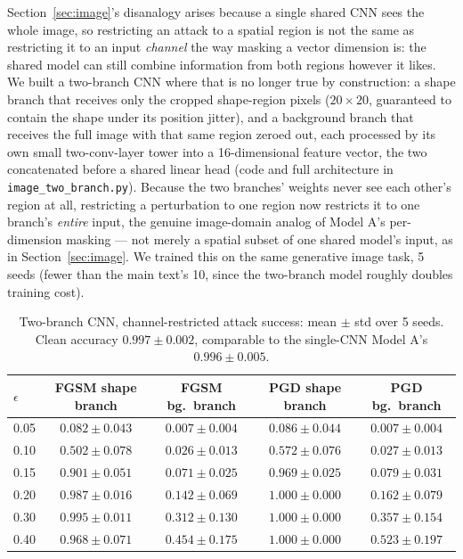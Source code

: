 \documentclass[11pt]{article}
\begin{document}
Section~\ref{sec:image}'s disanalogy arises because a single shared CNN
sees the whole image, so restricting an attack to a spatial region is not
the same as restricting it to an input \emph{channel} the way masking a
vector dimension is: the shared model can still combine information from
both regions however it likes. We built a two-branch CNN where that is no
longer true by construction: a shape branch that receives only the
cropped shape-region pixels ($20\times20$, guaranteed to contain the
shape under its position jitter), and a background branch that receives
the full image with that same region zeroed out, each processed by its
own small two-conv-layer tower into a 16-dimensional feature vector, the
two concatenated before a shared linear head (code and full architecture
in \texttt{image\_two\_branch.py}). Because the two branches' weights
never see each other's region at all, restricting a perturbation to one
region now restricts it to one branch's \emph{entire} input, the genuine
image-domain analog of Model A's per-dimension masking --- not merely a
spatial subset of one shared model's input, as in Section~\ref{sec:image}.
We trained this on the same generative image task, 5 seeds (fewer than
the main text's 10, since the two-branch model roughly doubles training
cost).

\begin{table}[h]
\centering
\caption{Two-branch CNN, channel-restricted attack success: mean $\pm$
std over 5 seeds. Clean accuracy $0.997\pm0.002$, comparable to the
single-CNN Model A's $0.996\pm0.005$.}
\label{tab:twobranch}
\begin{tabular}{lcccc}
\toprule
$\epsilon$ & FGSM shape branch & FGSM bg.\ branch & PGD shape branch & PGD bg.\ branch \\
\midrule
0.05 & $0.082\pm0.043$ & $0.007\pm0.004$ & $0.086\pm0.044$ & $0.007\pm0.004$ \\
0.10 & $0.502\pm0.078$ & $0.026\pm0.013$ & $0.572\pm0.076$ & $0.027\pm0.013$ \\
0.15 & $0.901\pm0.051$ & $0.071\pm0.025$ & $0.969\pm0.025$ & $0.079\pm0.031$ \\
0.20 & $0.987\pm0.016$ & $0.142\pm0.069$ & $1.000\pm0.000$ & $0.162\pm0.079$ \\
0.30 & $0.995\pm0.011$ & $0.312\pm0.130$ & $1.000\pm0.000$ & $0.357\pm0.154$ \\
0.40 & $0.968\pm0.071$ & $0.454\pm0.175$ & $1.000\pm0.000$ & $0.523\pm0.197$ \\
\bottomrule
\end{tabular}
\end{table}
\end{document}
